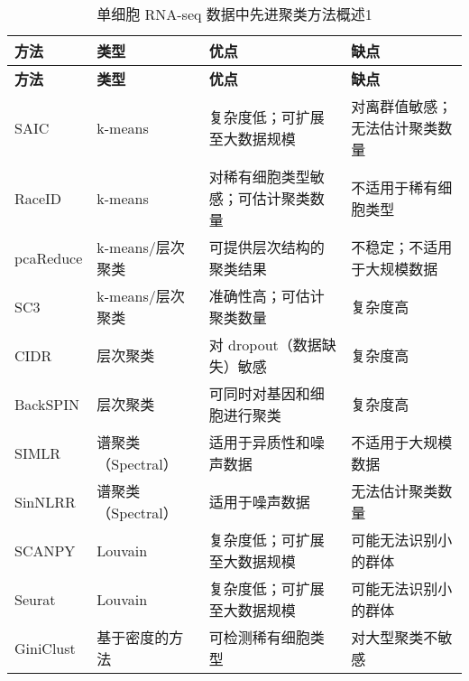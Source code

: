 \begin{longtable}{>{\centering\arraybackslash}p{2cm}
                  >{\centering\arraybackslash}p{2.5cm}
                  >{\centering\arraybackslash}p{5cm}
                  >{\centering\arraybackslash}p{5cm}}
  \caption{单细胞 RNA-seq 数据中先进聚类方法概述1}
  \label{tab:clusterSummary1} \\
  \toprule
  \textbf{方法} & \textbf{类型} & \textbf{优点} & \textbf{缺点} \\
  \midrule
  \endfirsthead
  
  \toprule
  \textbf{方法} & \textbf{类型} & \textbf{优点} & \textbf{缺点} \\
  \midrule
  \endhead
  
  \bottomrule
  \endfoot
  
  SAIC      & k-means            & 复杂度低；可扩展至大数据规模       & 对离群值敏感；无法估计聚类数量 \\
  RaceID    & k-means            & 对稀有细胞类型敏感；可估计聚类数量 & 不适用于稀有细胞类型 \\
  pcaReduce & k-means/层次聚类   & 可提供层次结构的聚类结果           & 不稳定；不适用于大规模数据 \\
  SC3       & k-means/层次聚类   & 准确性高；可估计聚类数量           & 复杂度高 \\
  CIDR      & 层次聚类           & 对 dropout（数据缺失）敏感         & 复杂度高 \\
  BackSPIN  & 层次聚类           & 可同时对基因和细胞进行聚类         & 复杂度高 \\
  SIMLR     & 谱聚类（Spectral） & 适用于异质性和噪声数据             & 不适用于大规模数据 \\
  SinNLRR   & 谱聚类（Spectral） & 适用于噪声数据                     & 无法估计聚类数量 \\
  SCANPY    & Louvain            & 复杂度低；可扩展至大数据规模       & 可能无法识别小的群体 \\
  Seurat    & Louvain            & 复杂度低；可扩展至大数据规模       & 可能无法识别小的群体 \\
  GiniClust & 基于密度的方法     & 可检测稀有细胞类型                 & 对大型聚类不敏感 \\
\end{longtable}

